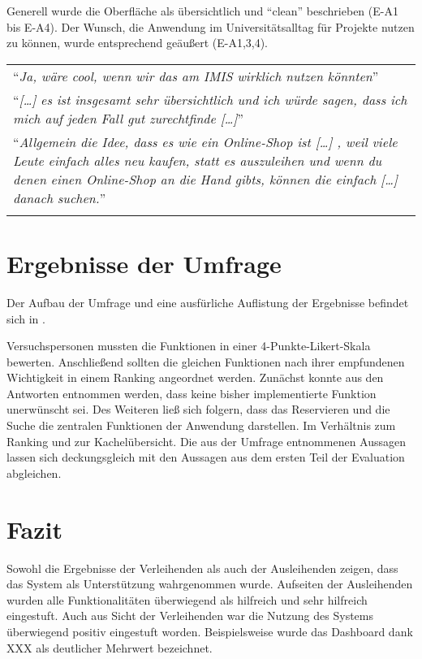 Generell wurde die Oberfläche als übersichtlich und \enquote{clean} beschrieben
(E-A1 bis E-A4). Der Wunsch, die Anwendung im Universitätsalltag für Projekte
nutzen zu können, wurde entsprechend geäußert (E-A1,3,4).

\begin{longtable}{p{}} \arrayrulecolor{maincolor}\hline
  \enquote{\textit{Ja, wäre cool, wenn wir das am IMIS wirklich nutzen
  könnten}}                                                      \\
  \enquote{\textit{[\dots] es ist insgesamt sehr übersichtlich und ich würde
  sagen, dass ich mich auf jeden Fall gut zurechtfinde [\dots]}} \\
  \enquote{\textit{Allgemein die Idee, dass es wie ein Online-Shop ist [\dots] ,
      weil viele Leute einfach alles neu kaufen, statt es auszuleihen und wenn du
      denen einen Online-Shop an die Hand gibts, können die einfach [\dots] danach
  suchen.}}                                                      \\
  \arrayrulecolor{maincolor}\hline
\end{longtable}


\section{Ergebnisse der Umfrage}
Der Aufbau der Umfrage und eine ausfürliche Auflistung der Ergebnisse befindet sich in . 

Versuchspersonen mussten die Funktionen in einer 4-Punkte-Likert-Skala bewerten. Anschließend
sollten die gleichen Funktionen nach ihrer empfundenen Wichtigkeit in einem Ranking angeordnet
werden. Zunächst konnte aus den Antworten entnommen werden, dass keine bisher implementierte
Funktion unerwünscht sei. Des Weiteren ließ sich folgern, dass das Reservieren und die Suche die zentralen
Funktionen der Anwendung darstellen. Im Verhältnis zum
Ranking und zur Kachelübersicht. Die aus der Umfrage entnommenen Aussagen lassen sich
deckungsgleich mit den Aussagen aus dem ersten Teil der Evaluation abgleichen.

\section{Fazit}


Sowohl die Ergebnisse der Verleihenden als auch der Ausleihenden zeigen, dass das System als
Unterstützung wahrgenommen wurde. Aufseiten der Ausleihenden wurden alle Funktionalitäten
überwiegend als hilfreich und sehr hilfreich eingestuft. Auch aus Sicht der Verleihenden
war die Nutzung des Systems überwiegend positiv eingestuft worden. Beispielsweise
wurde das Dashboard dank XXX als deutlicher Mehrwert bezeichnet.

